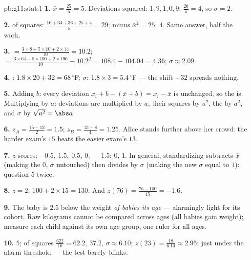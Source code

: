 \begin{solution}{pb:g11:stat:1}
\textbf{1.}  $\bar x = \frac{25}{5} = 5$. Deviations
squared: $1, 9, 1, 0, 9$:  $\frac{20}{5} = 4$, so
$\sigma = 2$.

\textbf{2.}  of squares:
$\frac{16 + 64 + 36 + 25 + 4}{5} = 29$; minus
$\bar x^2 = 25$:  $4$. Same answer, half the work.

\textbf{3.}  $= \frac{3 \times 8 + 5 \times 10 + 2 \times
14}{10} = 10.2$;  $= \frac{3 \times 64 + 5 \times 100 +
2 \times 196}{10} - 10.2^2 = 108.4 - 104.04 = 4.36$;
$\sigma \approx 2.09$.

\textbf{4.} : $1.8 \times 20 + 32 = 68\,^\circ$F;
$\sigma$: $1.8 \times 3 = 5.4\,^\circ$F --- the shift $+32$
spreads nothing.

\textbf{5.} Adding $b$: every deviation $x_i + b - (\bar x + b)
= x_i - \bar x$ is unchanged, so the  is. Multiplying
by $a$: deviations are multiplied by $a$, their squares by
$a^2$, the  by $a^2$, and $\sigma$ by
$\sqrt{a^2} = \abs a$.

\textbf{6.} $z_A = \frac{15 - 12}{2} = 1.5$;
$z_B = \frac{13 - 8}{4} = 1.25$. Alice stands further above her
crowd: the harder exam's $15$ beats the easier exam's $13$.

\textbf{7.} $z$-scores: $-0.5,\ 1.5,\ 0.5,\ 0,\ -1.5$: 
$0$,  $1$. In general, standardizing
subtracts $\bar x$ (making the  $0$, $\sigma$ untouched)
then divides by $\sigma$ (making the new $\sigma$ equal to
$1$): question 5 twice.

\textbf{8.} $z = 2$: $100 + 2 \times 15 = 130$. And
$z(76) = \frac{76 - 100}{15} = -1.6$.

\textbf{9.} The baby is $2.5$  below the
 weight \emph{of babies its age} --- alarmingly light for
its cohort. Raw kilograms cannot be compared across ages (all
babies gain weight);  measure each child against its
own age group, one ruler for all ages.

\textbf{10.}  $5$;  of squares $\frac{622}{10} = 62.2$,
 $37.2$, $\sigma \approx 6.10$;
$z(23) = \frac{18}{6.10} \approx 2.95$: just under the alarm
threshold --- the test barely blinks.


\end{solution}
